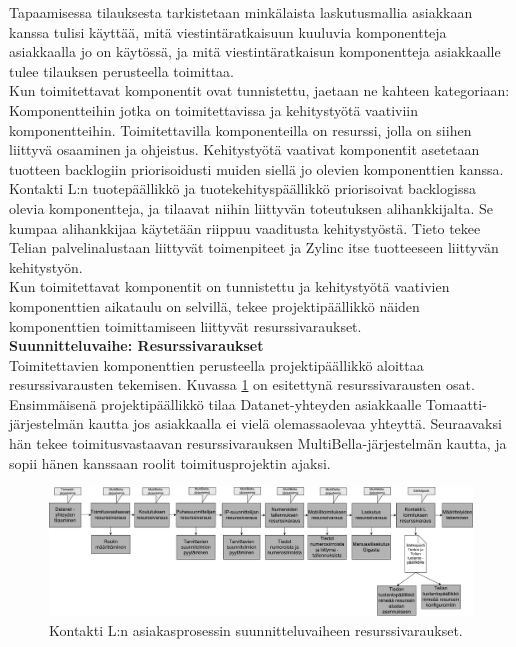 \documentclass[finnish,12pt,a4paper,pdftex]{article}
\begin{document}
Tapaamisessa tilauksesta tarkistetaan minkälaista laskutusmallia asiakkaan kanssa tulisi käyttää, mitä viestintäratkaisuun kuuluvia komponentteja asiakkaalla jo on käytössä, ja mitä viestintäratkaisun komponentteja asiakkaalle tulee tilauksen perusteella toimittaa.\\

Kun toimitettavat komponentit ovat tunnistettu, jaetaan ne kahteen kategoriaan: Komponentteihin jotka on toimitettavissa ja kehitystyötä vaativiin komponentteihin. Toimitettavilla komponenteilla on resurssi, jolla on siihen liittyvä osaaminen ja ohjeistus. Kehitystyötä vaativat komponentit asetetaan tuotteen backlogiin priorisoidusti muiden siellä jo olevien komponenttien kanssa.\\

Kontakti L:n tuotepäällikkö ja tuotekehityspäällikkö priorisoivat backlogissa olevia komponentteja, ja tilaavat niihin liittyvän toteutuksen alihankkijalta. Se kumpaa alihankkijaa käytetään riippuu vaaditusta kehitystyöstä. Tieto tekee Telian palvelinalustaan liittyvät toimenpiteet ja Zylinc itse tuotteeseen liittyvän kehitystyön.\\

Kun toimitettavat komponentit on tunnistettu ja kehitystyötä vaativien komponenttien aikataulu on selvillä, tekee projektipäällikkö näiden komponenttien toimittamiseen liittyvät resurssivaraukset.\\

\textbf{Suunnitteluvaihe: Resurssivaraukset}\\

Toimitettavien komponenttien perusteella projektipäällikkö aloittaa resurssivarausten tekemisen. Kuvassa \ref{fig:resurssit} on esitettynä resurssivarausten osat. Ensimmäisenä projektipäällikkö tilaa Datanet-yhteyden asiakkaalle Tomaatti-järjestelmän kautta jos asiakkaalla ei vielä olemassaolevaa yhteyttä. Seuraavaksi hän tekee toimitusvastaavan resurssivarauksen MultiBella-järjestelmän kautta, ja sopii hänen kanssaan roolit toimitusprojektin ajaksi.\\

\begin{figure}[!h]
    \centering
    \includegraphics[scale=0.25]{images/resurssivaraukset.pdf}
    \caption{Kontakti L:n asiakasprosessin suunnitteluvaiheen resurssivaraukset.}
    \label{fig:resurssit}
\end{figure}
\end{document}
